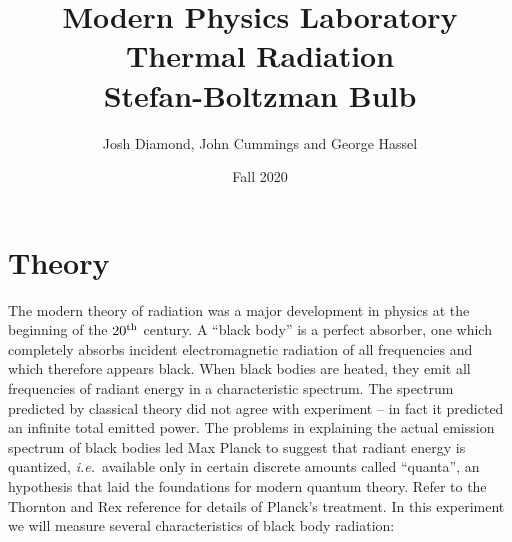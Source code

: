 \documentclass{article}
\begin{document}
\title{Modern Physics Laboratory\\
Thermal Radiation \\
Stefan-Boltzman Bulb}
\author{Josh Diamond, John Cummings and George Hassel}
\date{Fall 2020}
\maketitle



\section{Theory}


The modern theory of radiation was a major development in physics at the
beginning of the $20^{\rm th}$ century. A
``black body'' is a perfect
absorber, one which completely absorbs incident electromagnetic
radiation of all frequencies and which therefore appears black. When
black bodies are heated, they emit all frequencies of radiant energy in
a characteristic spectrum.  The spectrum predicted by classical theory
did not agree with experiment -- in fact it predicted an infinite total
emitted power.  The problems in explaining the actual emission
spectrum of black bodies led Max Planck to suggest that radiant energy
is quantized, {\em i.e.}\ available only in certain discrete amounts called
``quanta'', an hypothesis that laid
the foundations for modern quantum theory.  Refer to the Thornton and Rex
reference for details of Planck's treatment.  In this experiment we will measure several characteristics of black
body radiation:
\end{document}
